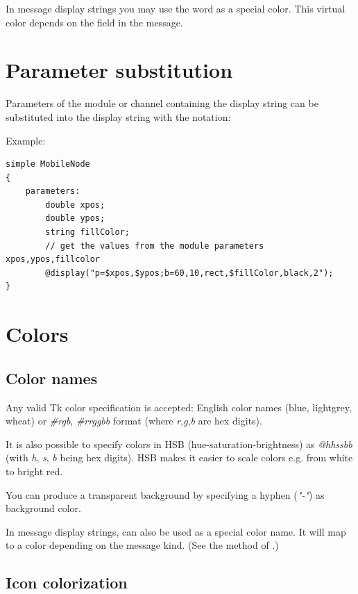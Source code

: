 \begin{note}
   In message display strings you may use the word  as a special color.
   This virtual color depends on the  field in the message.
\end{note}



\section{Parameter substitution}

Parameters of the module or channel containing the
display string can be substituted into the display string
with the  notation:

Example:
\begin{verbatim}
simple MobileNode
{
    parameters:
        double xpos;
        double ypos;
        string fillColor;
        // get the values from the module parameters xpos,ypos,fillcolor
        @display("p=$xpos,$ypos;b=60,10,rect,$fillColor,black,2");
}
\end{verbatim}

\section{Colors}
\label{sec:ch-graphics:colors}

\subsection{Color names}

Any valid Tk color specification is accepted: English color names
(blue, lightgrey, wheat) or \textit{\#rgb}, \textit{\#rrggbb} format
(where \textit{r},\textit{g},\textit{b} are hex digits).

It is also possible to specify colors in HSB (hue-saturation-brightness) as
\textit{@hhssbb} (with \textit{h}, \textit{s}, \textit{b} being hex digits).
HSB makes it easier to scale colors e.g. from white to bright red.

You can produce a transparent background by specifying a hyphen (\textit{"-"})
as background color.

In message display strings,  can also be used as a special color name.
It will map to a color depending on the message kind.
(See the  method of .)

\subsection{Icon colorization}

